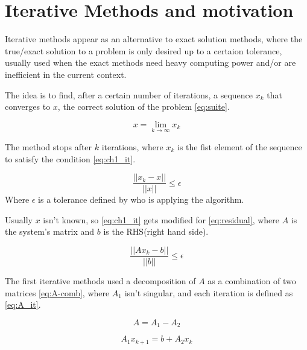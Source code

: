 \section{Iterative Methods and motivation}
    

    Iterative methods appear as an alternative to exact solution methods, where the true/exact solution to a problem is only desired up to a certaion tolerance, usually used when the exact methods need heavy computing power and/or are inefficient in the current context.
    
    The idea is to find, after a certain number of iterations, a sequence ${x_{k}}$ that converges to $x$, the correct solution of the problem \ref{eq:suite}.


    \begin{equation}\label{eq:suite}
        x = \lim_{k \to \infty} x_{k}
    \end{equation}

    
    The method stops after $k$ iterations, where $x_{k}$ is the fist element of the sequence to satisfy the condition \ref{eq:ch1_it}.


    \begin{equation}\label{eq:ch1_it}
       \frac{||x_{k} - x||}{||x||} \leq \epsilon
    \end{equation}
    Where $\epsilon$ is a tolerance defined by who is applying the algorithm.

    Usually $x$ isn't known, so \ref{eq:ch1_it} gets modified for \ref{eq:residual}, where $A$ is the system's matrix and $b$ is the RHS(right hand side).

    \begin{equation}\label{eq:residual}
        \frac{||Ax_{k} - b||}{||b||} \leq \epsilon
    \end{equation}

    The first iterative methods used a decomposition of $A$ as a combination of two matrices \ref{eq:A-comb}, where $A_{1}$ isn't singular, and each iteration is defined as \ref{eq:A_it}.
    
    \begin{equation}\label{eq:A-comb}
        A = A_{1} - A_{2}
    \end{equation}

    \begin{equation}\label{eq:A_it}
        A_{1} x_{k+1} = b + A_{2}x_{k}
    \end{equation}

